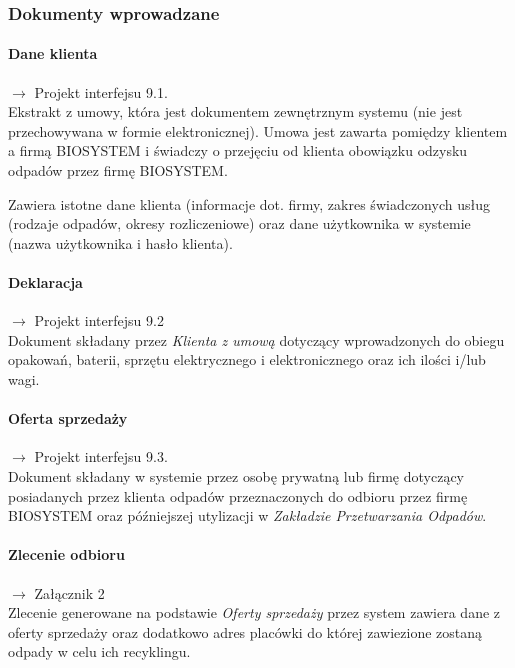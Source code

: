
\subsubsection{Dokumenty wprowadzane}

	\paragraph{Dane klienta} $\rightarrow$ Projekt interfejsu 9.1. \\
	Ekstrakt z umowy, która jest dokumentem zewnętrznym systemu (nie jest przechowywana w formie elektronicznej).
	Umowa jest zawarta pomiędzy klientem a firmą BIOSYSTEM i świadczy o przejęciu od klienta obowiązku odzysku odpadów przez firmę BIOSYSTEM.

	Zawiera istotne dane klienta (informacje dot. firmy, zakres świadczonych usług (rodzaje odpadów, okresy rozliczeniowe) oraz dane użytkownika w systemie (nazwa użytkownika i hasło klienta).

	\paragraph{Deklaracja} $\rightarrow$ Projekt interfejsu 9.2 \\
	Dokument składany przez \emph{Klienta z umową} dotyczący wprowadzonych do obiegu opakowań, baterii, sprzętu elektrycznego i elektronicznego oraz ich ilości i/lub wagi.

	\paragraph{Oferta sprzedaży} $\rightarrow$ Projekt interfejsu 9.3.\ \\
	Dokument składany w systemie przez osobę prywatną lub firmę dotyczący posiadanych przez klienta odpadów przeznaczonych do odbioru przez firmę BIOSYSTEM oraz późniejszej utylizacji w \emph{Zakładzie Przetwarzania Odpadów}.

	\paragraph{Zlecenie odbioru} $\rightarrow$ Załącznik 2 \\
	Zlecenie generowane na podstawie \emph{Oferty sprzedaży} przez system zawiera dane z oferty sprzedaży oraz dodatkowo adres placówki do której zawiezione zostaną odpady w celu ich recyklingu.


